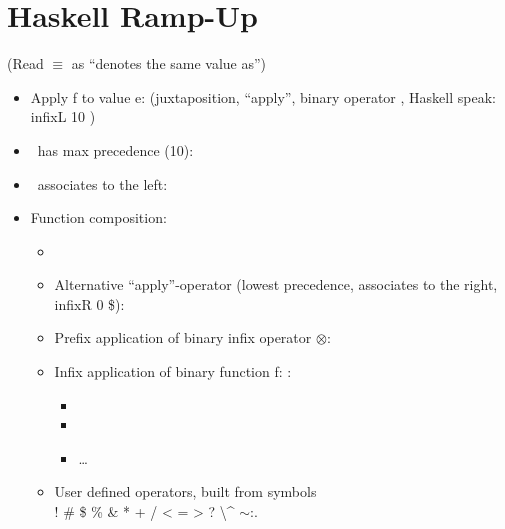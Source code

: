 

\section{Haskell Ramp-Up} %
\label{cha:haskell_ramp_up}

(Read $\equiv$ as ``denotes the same value as'')

\begin{itemize}
    \item Apply f to value e:  (juxtaposition, ``apply'', binary operator \textvisiblespace, Haskell speak: infixL 10 \textvisiblespace)
    \item \textvisiblespace\ has max precedence (10): 
    \item \textvisiblespace\ associates to the left:  
    \item Function composition:
    \begin{itemize}
        \item {}
        \item Alternative ``apply''-operator \codeline{|\$|} (lowest precedence, associates to the right, infixR 0 \$):\\
        \item Prefix application of binary infix operator $\otimes$:  
        \item Infix application of binary function f: :
        \begin{itemize}
            \item {}
            \item {}
            \item \dots
        \end{itemize}
        \item User defined operators, built from symbols \\ ! \# \$ \% \& * + / < = > ? \@ \textbackslash \string^ \textbar $\sim$:.
    \end{itemize}
\end{itemize} 